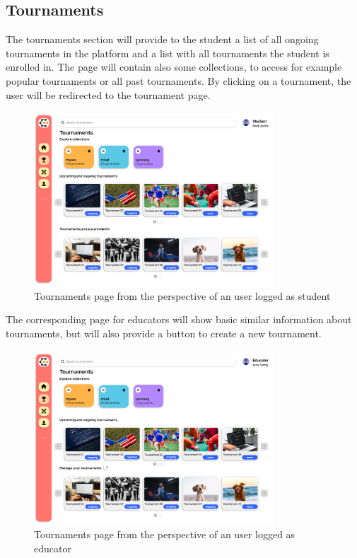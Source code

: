 \subsection{Tournaments}
The tournaments section will provide to the student a list of all ongoing tournaments in the platform and a list with all tournaments the student is enrolled in. The page will contain also some collections, to access for example popular tournaments or all past tournaments. By clicking on a tournament, the user will be redirected to the tournament page.\\ 
\begin{figure}[H]
    \centering
    \includegraphics[width=0.8\textwidth]{Mockups/4_student_tournaments.png}
    \caption{Tournaments page from the perspective of an user logged as student}
\end{figure}
The corresponding page for educators will show basic similar information about tournaments, but will also provide a button to create a new tournament.\\
\begin{figure}[H]
    \centering
    \includegraphics[width=0.8\textwidth]{Mockups/5_educator_tournaments.png}
    \caption{Tournaments page from the perspective of an user logged as educator}
\end{figure}
